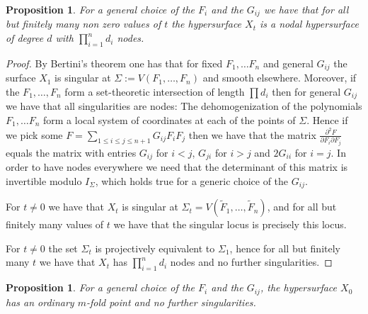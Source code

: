 \documentclass{amsart}
\newtheorem{proposition}[lemma]{Proposition}
\theoremstyle{definition}
\theoremstyle{remark}
\begin{document}
\begin{proposition} For a general choice of the $F_i$ and the $G_{ij}$ we have that for all but finitely many non zero values of $t$ the hypersurface  $X_t$ is a nodal hypersurface of degree $d$ with $\prod_{i=1}^n d_i$ nodes.
\end{proposition}
\begin{proof}
By Bertini's theorem one has that for fixed $F_1,\dots F_n$ and general $G_{ij}$ the surface $X_1$ is  singular at $\Sigma:=V(F_1,\dots,F_n)$ and smooth elsewhere. Moreover, if the $F_1,\dots,F_n$ form a set-theoretic intersection of length $\prod d_i$ then for general $G_{ij}$ we have that all singularities are nodes:
The dehomogenization of the  polynomials $F_1,\dots F_{n}$ form a local system of coordinates at each of the points of $\Sigma$.
Hence if we pick some $F=\sum_{1\leq i\leq j \leq n+1} G_{ij}F_iF_j$ then we have that the matrix  $\frac{ \partial^2 F}{\partial F_i\partial F_j}$ equals the matrix with entries $G_{ij}$ for $i<j$, $G_{ji}$ for $i>j$ and $2G_{ii}$ for $i=j$.
In order to have nodes everywhere we need that the determinant of this matrix is invertible modulo $I_{\Sigma}$, which holds true for a generic choice of the $G_{ij}$.


For $t\neq 0$ we have that $X_t$ is singular at $\Sigma_t=V(\tilde{F}_1,\dots,\tilde{F}_n)$, and for all but finitely many values of $t$ we have that the singular locus is precisely this locus.

 For $t\neq 0$ the set $\Sigma_t$ is projectively equivalent to $\Sigma_1$, hence for all but finitely many $t$ we have that $X_t$ has $\prod_{i=1}^n d_i$  nodes and no further singularities.
\end{proof}

\begin{proposition} For a general choice of the $F_i$ and the $G_{ij}$, the hypersurface $X_0$ has an ordinary $m$-fold point and no further singularities.
\end{proposition}
\end{document}
